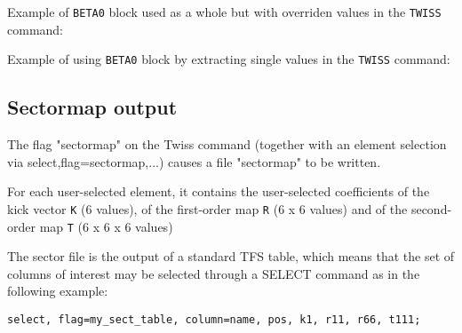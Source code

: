 Example of \texttt{BETA0} block used as a whole but with overriden
values in the \texttt{TWISS} command:

Example of using \texttt{BETA0} block by extracting single values in the
\texttt{TWISS} command:


%
\subsection{Sectormap output}
\label{subsec:sectormap}

The flag "sectormap" on the Twiss command (together with an element
selection via select,flag=sectormap,...) causes a file "sectormap" to be
written.   

For each user-selected element, it contains the user-selected coefficients of the kick vector 
\texttt{K} (6 values), of the first-order map 
\texttt{R} (6 x 6 values) and of the second-order map 
\texttt{T} (6 x 6 x 6 values)

The sector file is the output of a standard TFS table, which means that
the set of columns of interest may be selected through a SELECT command
as in the following example:  


\begin{verbatim}
select, flag=my_sect_table, column=name, pos, k1, r11, r66, t111;
\end{verbatim}


